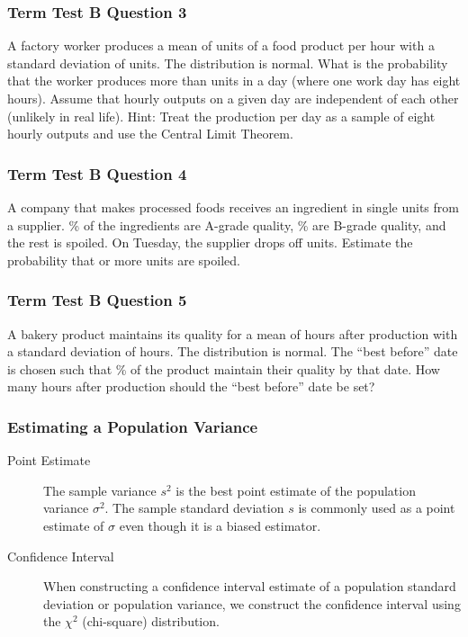 \documentclass[xcolor=dvipsnames]{beamer}
\begin{document}
\begin{frame}
  \frametitle{Term Test B Question 3}
  A factory worker produces a mean of {\esh} units of a food
product per hour with a standard deviation of {\chu} units. The
distribution is normal. What is the probability that the worker
produces more than {\pee} units in a day (where one work day has eight
hours). Assume that hourly outputs on a given day are independent of
each other (unlikely in real life). Hint: Treat the production per day
as a sample of eight hourly outputs and use the Central Limit Theorem.
\end{frame}

\begin{frame}
  \frametitle{Term Test B Question 4}
  A company that makes processed foods receives an
ingredient in single units from a supplier. {\ood}\% of the ingredients
are A-grade quality, {\tee}\% are B-grade quality, and the rest is
spoiled. On Tuesday, the supplier drops off {\aih} units. Estimate the
probability that {\aoj} or more units are spoiled.
\end{frame}

\begin{frame}
  \frametitle{Term Test B Question 5}
  A bakery product maintains its quality for a mean of {\eep}
hours after production with a standard deviation of {\eim} hours. The
distribution is normal. The ``best before'' date is chosen such that
{\sho}\% of the product maintain their quality by that date. How many
hours after production should the ``best before'' date be set?
\end{frame}

\begin{frame}
  \frametitle{Estimating a Population Variance}
  \begin{description}
  \item[Point Estimate] The sample variance $s^{2}$ is the best point
    estimate of the population variance $\sigma^{2}$. The sample
    standard deviation $s$ is commonly used as a point estimate of
    $\sigma$ even though it is a biased estimator.
  \item[Confidence Interval] When constructing a confidence interval
    estimate of a population standard deviation or population
    variance, we construct the confidence interval using the
    \alert{$\chi^{2}$ (chi-square) distribution}.
  \end{description}
\end{frame}
\end{document}
